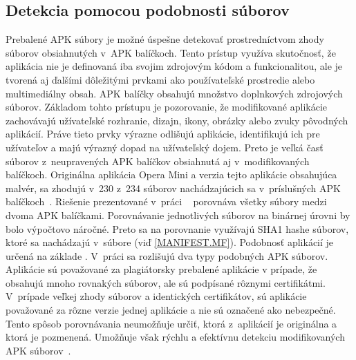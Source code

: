 \subsection{Detekcia pomocou podobnosti súborov}
Prebalené APK súbory je možné úspešne detekovať prostredníctvom zhody súborov obsiahnutých v~APK balíčkoch. Tento prístup využíva skutočnosť, že aplikácia nie je definovaná iba svojim zdrojovým kódom a funkcionalitou, ale je tvorená aj ďalšími dôležitými prvkami ako používateľské prostredie alebo multimediálny obsah. APK balíčky obsahujú množstvo doplnkových zdrojových súborov.  Základom tohto prístupu je pozorovanie, že modifikované aplikácie zachovávajú užívateľské rozhranie, dizajn, ikony, obrázky alebo zvuky pôvodných aplikácií. Práve tieto prvky výrazne odlišujú aplikácie, identifikujú ich pre užívateľov a majú výrazný dopad na užívateľský dojem. Preto je veľká časť súborov z~neupravených APK balíčkov obsiahnutá aj v~modifikovaných balíčkoch. Originálna aplikácia Opera Mini a verzia tejto aplikácie obsahujúca malvér, sa zhodujú v~230 z~234 súborov nachádzajúcich sa v~príslušných APK balíčkoch~\cite{Zhauniarovich2014}. Riešenie prezentované v~práci ~\cite{Zhauniarovich2014} porovnáva všetky súbory medzi dvoma APK balíčkami.  Porovnávanie jednotlivých súborov na binárnej úrovni by bolo výpočtovo náročné. Preto sa na porovnanie využívajú SHA1 hashe súborov, ktoré sa nachádzajú v~súbore  (viď \ref{MANIFEST.MF}). Podobnosť aplikácií je určená na základe . V~práci sa rozlišujú dva typy podobných APK súborov. Aplikácie sú považované za plagiátorsky prebalené aplikácie v prípade, že obsahujú mnoho rovnakých súborov, ale sú podpísané rôznymi certifikátmi. V~prípade veľkej zhody súborov a  identických certifikátov, sú aplikácie považované za rôzne verzie jednej aplikácie a nie sú označené ako nebezpečné. Tento spôsob porovnávania neumožňuje určiť, ktorá z~aplikácií je originálna a ktorá je pozmenená. Umožňuje však rýchlu a efektívnu detekciu modifikovaných APK súborov~\cite{Zhauniarovich2014}. 

